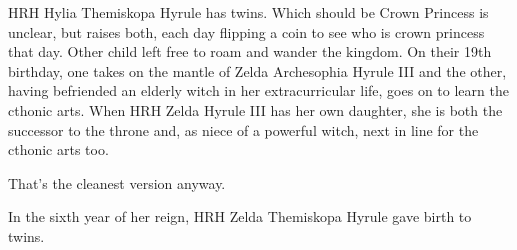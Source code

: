 \documentclass[../../FGP.tex]{subfiles}
\begin{document}


HRH Hylia Themiskopa Hyrule has twins.
Which should be Crown Princess is unclear, but raises both, each day flipping a coin to see who is crown princess that day. Other child left free to roam and wander the kingdom. On their 19th birthday,  one takes on the mantle of Zelda Archesophia Hyrule III and the other, having befriended an elderly witch in her extracurricular life, goes on to learn the cthonic arts. When HRH Zelda Hyrule III has her own daughter, she is both the successor to the throne and, as niece of a powerful witch, next in line for the cthonic arts too. 

That's the cleanest version anyway. 

\begin{fragment}
In the sixth year of her reign, HRH Zelda Themiskopa Hyrule gave birth to twins.


\end{fragment}
\end{document}
